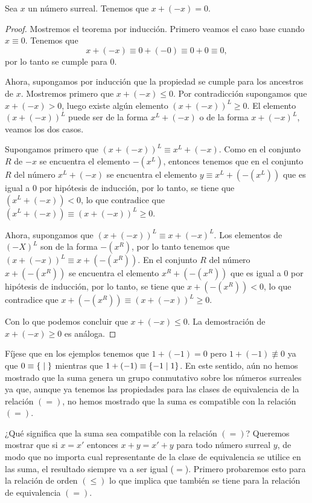    \begin{theorem}
        Sea $x$ un n\'umero surreal. Tenemos que $x+(-x)=0$.
    \end{theorem}

    \begin{proof}
        Mostremos el teorema por inducci\'on. Primero veamos el caso base cuando $x\equiv 0$. Tenemos que
        \[
            x + (-x) \equiv 0 + (-0) \equiv 0+0 \equiv 0,
        \]
        por lo tanto se cumple para $0$.

        Ahora, supongamos por inducci\'on que la propiedad se cumple para los ancestros de $x$. Mostremos primero que $x + (-x) \le 0$. Por contradicci\'on supongamos que $x + (-x) > 0$, luego existe alg\'un elemento $(x + (-x))^L \ge 0$. El elemento $(x + (-x))^L$ puede ser de la forma $x^L + (-x)$ o de la forma $x + (-x)^L$, veamos los dos casos.

        Supongamos primero que $(x + (-x))^L \equiv x^L + (-x)$. Como en el conjunto $R$ de $-x$ se encuentra el elemento $-(x^L)$, entonces tenemos que en el conjunto $R$ del n\'umero $x^L + (-x)$ se encuentra el elemento $y \equiv x^L + (-(x^L))$ que es igual a $0$ por hip\'otesis de inducci\'on, por lo tanto, se tiene que $(x^L + (-x)) < 0$, lo que contradice que $(x^L + (-x))\equiv (x + (-x))^L \ge 0$.

        Ahora, supongamos que $(x + (-x))^L \equiv x + (-x)^L$. Los elementos de $(-X)^L$ son de la forma $-(x^R)$, por lo tanto tenemos que $(x + (-x))^L\equiv x + (-(x^R))$. En el conjunto $R$ del n\'umero $x + (-(x^R))$ se encuentra el elemento $x^R + (-(x^R))$ que es igual a $0$ por hip\'otesis de inducci\'on, por lo tanto, se tiene que $x + (-(x^R)) < 0$, lo que contradice que $x + (-(x^R))\equiv (x + (-x))^L \ge 0$.

        Con lo que podemos concluir que $x + (-x) \le 0$. La demostraci\'on de $x+(-x) \ge 0$ es an\'aloga.
    \end{proof}


    F\'ijese que en los ejemplos tenemos que $1+(-1) = 0$ pero $1+(-1)\not\equiv 0$ ya que $0\equiv \left\{\;\middle|\; \right\}$ mientras que $1+(-1)\equiv \left\{-1\;\middle|\; 1\right\}$. En este sentido, a\'un no hemos mostrado que la suma genera un grupo conmutativo sobre los n\'umeros surreales ya que, aunque ya tenemos las propiedades para las clases de equivalencia de la relaci\'on $(=)$, no hemos mostrado que la suma es compatible con la relaci\'on $(=)$.
    
    ¿Qué significa que la suma sea compatible con la relaci\'on $(=)$? Queremos mostrar que si $x = x'$ entonces $x+y = x'+y$ para todo n\'umero surreal $y$, de modo que no importa cual representante de la clase de equivalencia se utilice en las suma, el resultado siempre va a ser igual ($=$). Primero probaremos esto para la relaci\'on de orden $(\le)$ lo que implica que tambi\'en se tiene para la relaci\'on de equivalencia $(=)$.

